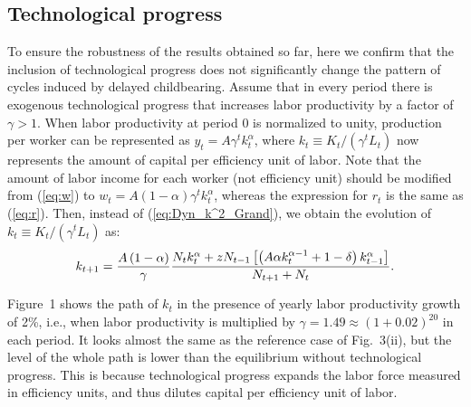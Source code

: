 \documentclass[nogrid]{MBE}%
\begin{document}
{\subsection{Technological progress}

To ensure the robustness of the results obtained so far, here we confirm that
the inclusion of technological progress does not significantly change the
pattern of cycles induced by delayed childbearing. Assume that in every period
there is exogenous technological progress that increases labor productivity by
a factor of $\gamma>1$. When labor productivity at period 0 is normalized to
unity, production per worker can be represented as $y_{t}=A \gamma^{t}
k_{t}^{\alpha}$, where $k_{t}\equiv K_{t}/(\gamma^{t} L_{t})$ now represents
the amount of capital per efficiency unit of labor. Note that the amount of
labor income for each worker (not efficiency unit) should be modified from
(\ref{eq:w}) to $w_{t}=A(1-\alpha)\gamma^{t} k_{t}^{\alpha}$, whereas the
expression for $r_{t}$ is the same as (\ref{eq:r}). Then, instead of
(\ref{eq:Dyn_k^2_Grand}), we obtain the evolution of $k_{t}\equiv
K_{t}/(\gamma^{t} L_{t})$ as:
\begin{equation}
\label{eq:evo_k_growth}k_{t+1} = \frac{A\left(  1-\alpha\right)  }{\gamma}
\frac{N_{t}k_{t}^{\alpha} +zN_{t-1}\left[  \left(  A\alpha k_{t}^{\alpha -1}+1-\delta\right)
k_{t-1}^{\alpha}\right]  }
{N_{t+1}+N_{t}}.\\
\end{equation}



Figure~1 shows the path of $k_{t}$ in the presence of yearly labor productivity growth of 2\%,
i.e., when labor productivity is multiplied by $\gamma=1.49 \approx(1+0.02)^{20}$ in each period.
It looks almost the same as the reference case of Fig.~3(ii), but the level of the whole path is
lower than the equilibrium without technological progress. This is because technological progress
expands the labor force measured in efficiency units, and thus dilutes capital per efficiency unit
of labor.

}
\end{document}
